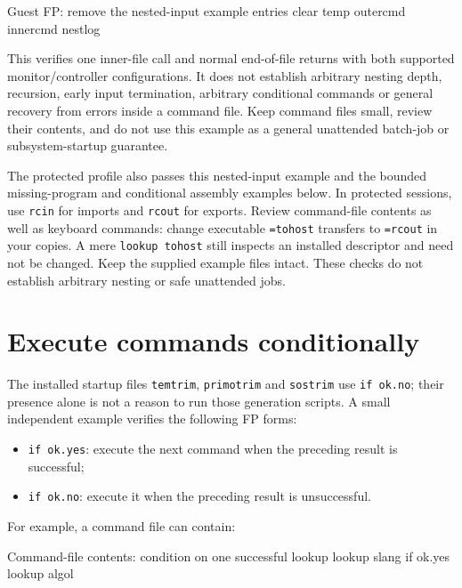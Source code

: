 \begin{commandexample}{Guest FP: remove the nested-input example entries}
clear temp outercmd innercmd nestlog
\end{commandexample}

This verifies one inner-file call and normal end-of-file returns with both supported monitor/controller configurations. It does not establish arbitrary nesting depth, recursion, early input termination, arbitrary conditional commands or general recovery from errors inside a command file. Keep command files small, review their contents, and do not use this example as a general unattended batch-job or subsystem-startup guarantee.

The protected profile also passes this nested-input example and the bounded
missing-program and conditional assembly examples below. In protected sessions,
use \texttt{rcin} for imports and \texttt{rcout} for exports. Review command-file
contents as well as keyboard commands: change executable \texttt{=tohost}
transfers to \texttt{=rcout} in your copies. A mere \texttt{lookup tohost} still
inspects an installed descriptor and need not be changed. Keep the supplied
example files intact. These checks do not establish arbitrary nesting or safe
unattended jobs.

\section{Execute commands conditionally}\label{execute-commands-conditionally}

The installed startup files \passthrough{\lstinline!temtrim!}, \passthrough{\lstinline!primotrim!} and \passthrough{\lstinline!sostrim!} use \passthrough{\lstinline!if ok.no!}; their presence alone is not a reason to run those generation scripts. A small independent example verifies the following FP forms:

\begin{itemize}
\tightlist
\item
  \passthrough{\lstinline!if ok.yes!}: execute the next command when the preceding result is successful;
\item
  \passthrough{\lstinline!if ok.no!}: execute it when the preceding result is unsuccessful.
\end{itemize}

For example, a command file can contain:

\begin{commandexample}{Command-file contents: condition on one successful lookup}
lookup slang
if ok.yes
lookup algol
\end{commandexample}

